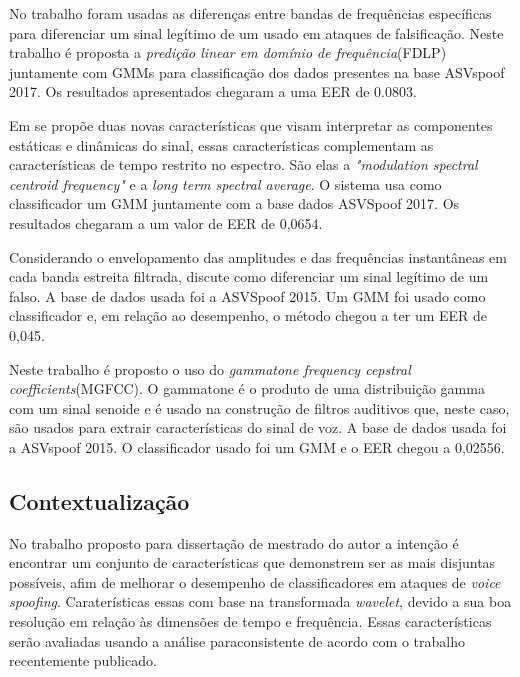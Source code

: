 \documentclass[a4paper,12pt,openright,oneside]{book}
\newenvironment{myenv}[1]
  {\begin{spacing}{#1}}
  {\end{spacing}}
\begin{document}
\begin{myenv}{1.5}
			\par No trabalho \cite{ISI:000465363900139} foram usadas as diferenças entre bandas de frequências específicas para diferenciar um sinal legítimo de um usado em ataques de falsificação. Neste trabalho é proposta a \textit{predição linear em domínio de frequência}(FDLP) juntamente com GMMs para classificação dos dados presentes na base ASVspoof  2017. Os resultados apresentados chegaram a uma EER de 0.0803.
			
			\par Em \cite{Suthokumar2018} se propõe duas novas características que visam interpretar as componentes estáticas e dinâmicas do sinal, essas características complementam as características de tempo restrito no espectro. São elas a \textit{"modulation  spectral  centroid  frequency"} e a \textit{long term spectral average}. O sistema usa como classificador um GMM juntamente com a base dados ASVSpoof 2017. Os resultados chegaram a um valor de EER de 0,0654.
			
			\par Considerando o envelopamento das amplitudes e das frequências instantâneas em cada banda estreita filtrada,  \cite{ISI:000458728700054} discute como diferenciar um sinal legítimo de um falso. A base de dados usada foi a  ASVSpoof 2015. Um GMM foi usado como classificador e, em relação ao desempenho, o método chegou a ter um EER de 0,045.

			\par Neste trabalho \cite{ISI:000392503100008} é proposto o uso do \textit{gammatone frequency cepstral coefficients}(MGFCC). O gammatone é o produto de uma distribuição gamma com um sinal senoide e é usado na construção de filtros auditivos que, neste caso, são usados para extrair características do sinal de voz. A base de dados usada foi a ASVspoof 2015. O classificador usado foi um GMM e o EER chegou a 0,02556.

			\subsection{Contextualização}
			\par No trabalho proposto para dissertação de mestrado do autor a intenção é encontrar um conjunto de características que demonstrem ser as mais disjuntas possíveis, afim de melhorar o desempenho de classificadores em ataques de \textit{voice spoofing}. Caraterísticas essas com base na transformada \textit{wavelet}, devido a sua boa resolução em relação às dimensões de tempo e frequência. Essas características serão avaliadas usando a análise paraconsistente de acordo com o trabalho \cite{8588433} recentemente publicado.

		\end{myenv}
\end{document}
